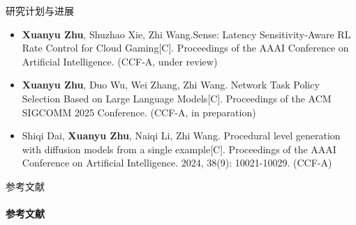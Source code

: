 \documentclass{beamer}
\begin{document}
\begin{frame}[fragile]{研究计划与进展}
\begin{itemize}

\item \textbf{Xuanyu Zhu}, Shuzhao Xie, Zhi Wang.Sense: Latency Sensitivity-Aware RL Rate Control for Cloud Gaming[C]. Proceedings of the AAAI Conference on Artificial Intelligence. (CCF-A, under review)
    
    \item \textbf{Xuanyu Zhu}, Duo Wu, Wei Zhang, Zhi Wang. Network Task Policy Selection Based on Large Language Models[C]. Proceedings of the ACM SIGCOMM 2025 Conference. (CCF-A, in preparation)
    
    \item Shiqi Dai, \textbf{Xuanyu Zhu}, Naiqi Li, Zhi Wang. Procedural level generation with diffusion models from a single example[C]. Proceedings of the AAAI Conference on Artificial Intelligence. 2024, 38(9): 10021-10029. (CCF-A)
\end{itemize}
\end{frame}
\backmatter




\begin{frame}[allowframebreaks]{参考文献}
\framesubtitle{参考文献}

    \begin{itemize}[noitemsep]  %
            \footnotesize  %
            \printbibliography[heading=none]  %
    \end{itemize}
\end{frame}
\end{document}

